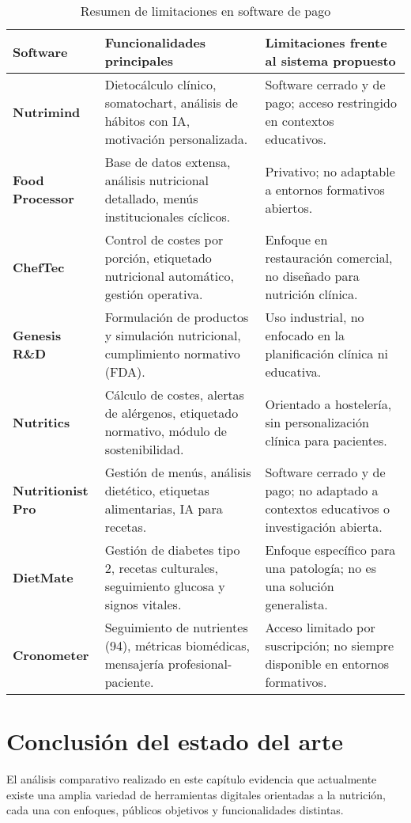 \begin{table}[H]
\begin{longtable}{|p{2.6cm}|p{4.4cm}|p{4.4cm}|}
\hline
\textbf{Software} & \textbf{Funcionalidades principales} & \textbf{Limitaciones frente al sistema propuesto} \\
\hline
\textbf{Nutrimind} & Dietocálculo clínico, somatochart, análisis de hábitos con IA, motivación personalizada. & Software cerrado y de pago; acceso restringido en contextos educativos. \\
\hline
\textbf{Food Processor} & Base de datos extensa, análisis nutricional detallado, menús institucionales cíclicos. & Privativo; no adaptable a entornos formativos abiertos. \\
\hline
\textbf{ChefTec} & Control de costes por porción, etiquetado nutricional automático, gestión operativa. & Enfoque en restauración comercial, no diseñado para nutrición clínica. \\
\hline
\textbf{Genesis R\&D} & Formulación de productos y simulación nutricional, cumplimiento normativo (FDA). & Uso industrial, no enfocado en la planificación clínica ni educativa. \\
\hline
\textbf{Nutritics} & Cálculo de costes, alertas de alérgenos, etiquetado normativo, módulo de sostenibilidad. & Orientado a hostelería, sin personalización clínica para pacientes. \\
\hline
\textbf{Nutritionist Pro} & Gestión de menús, análisis dietético, etiquetas alimentarias, IA para recetas. & Software cerrado y de pago; no adaptado a contextos educativos o investigación abierta. \\
\hline
\textbf{DietMate} & Gestión de diabetes tipo 2, recetas culturales, seguimiento glucosa y signos vitales. & Enfoque específico para una patología; no es una solución generalista. \\
\hline
\textbf{Cronometer} & Seguimiento de nutrientes (94), métricas biomédicas, mensajería profesional-paciente. & Acceso limitado por suscripción; no siempre disponible en entornos formativos. \\
\hline
\end{longtable}
\caption{Resumen de limitaciones en software de pago}
\label{tab:software_pago}
\end{table}

\section{Conclusión del estado del arte}
El análisis comparativo realizado en este capítulo evidencia que actualmente existe una amplia variedad de herramientas digitales orientadas a la nutrición, cada una con enfoques, públicos objetivos y funcionalidades distintas. 


